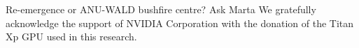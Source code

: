 \documentclass[essd, manuscript]{copernicus}
\begin{document}


\appendixfigures  %

\appendixtables   %







\begin{acknowledgements}
Re-emergence or ANU-WALD bushfire centre? Ask Marta
We gratefully acknowledge the support of NVIDIA Corporation with the donation of the Titan Xp GPU used in this research.
\end{acknowledgements}



\end{document}
